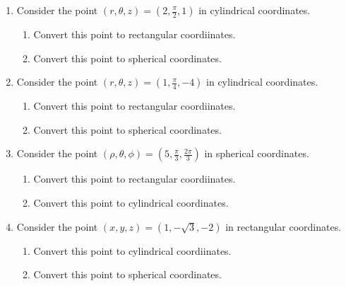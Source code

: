 \documentclass[12pt]{article}
\begin{document}
\begin{enumerate}

\item Consider the point $(r,\theta,z)=\left(2, \frac{\pi}{2}, 1\right)$ in cylindrical coordinates.

\begin{enumerate}

\item Convert this point to rectangular coordiinates.

\item Convert this point to spherical coordinates.

\end{enumerate}

\item Consider the point $(r,\theta,z)=\left(1, \frac{\pi}{4}, -4\right)$ in cylindrical coordinates.

\begin{enumerate}

\item Convert this point to rectangular coordiinates.

\item Convert this point to spherical coordinates.

\end{enumerate}

\item Consider the point $(\rho,\theta,\phi)=\left(5, \frac{\pi}{3}, \frac{2\pi}{3}\right)$ in spherical coordinates.

\begin{enumerate}

\item Convert this point to rectangular coordiinates.

\item Convert this point to cylindrical coordinates.

\end{enumerate}

\item Consider the point $(x,y,z)=\left(1, -\sqrt{3}, -2\right)$ in rectangular coordinates.

\begin{enumerate}

\item Convert this point to cylindrical coordiinates.

\item Convert this point to spherical coordinates.

\end{enumerate}

\end{enumerate}
\end{document}
